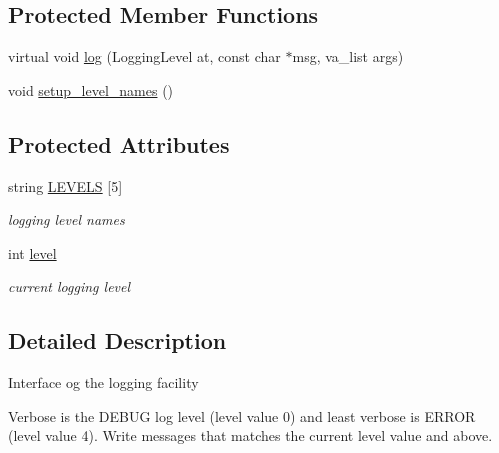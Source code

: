\subsection*{Protected Member Functions}
\begin{DoxyCompactItemize}
\item 
virtual void \hyperlink{classatmi_1_1logger_a5857a38d25d80a987ca1c7320bab1e74}{log} (Logging\+Level at, const char $\ast$msg, va\+\_\+list args)
\item 
void \hyperlink{classatmi_1_1logger_a775b09e9c2cdae0ff2b69216c8fb520a}{setup\+\_\+level\+\_\+names} ()
\end{DoxyCompactItemize}
\subsection*{Protected Attributes}
\begin{DoxyCompactItemize}
\item 
\hypertarget{classatmi_1_1logger_acaf86896f0cb3f7307ffc523b13607e0}{string \hyperlink{classatmi_1_1logger_acaf86896f0cb3f7307ffc523b13607e0}{L\+E\+V\+E\+L\+S} \mbox{[}5\mbox{]}}\label{classatmi_1_1logger_acaf86896f0cb3f7307ffc523b13607e0}

\begin{DoxyCompactList}\small\item\em logging level names \end{DoxyCompactList}\item 
\hypertarget{classatmi_1_1logger_a70bf3a05b911b63d4548507fdea5dfbd}{int \hyperlink{classatmi_1_1logger_a70bf3a05b911b63d4548507fdea5dfbd}{level}}\label{classatmi_1_1logger_a70bf3a05b911b63d4548507fdea5dfbd}

\begin{DoxyCompactList}\small\item\em current logging level \end{DoxyCompactList}\end{DoxyCompactItemize}


\subsection{Detailed Description}
Interface og the logging facility

Verbose is the D\+E\+B\+U\+G log level (level value 0) and least verbose is E\+R\+R\+O\+R (level value 4). Write messages that matches the current level value and above. 

